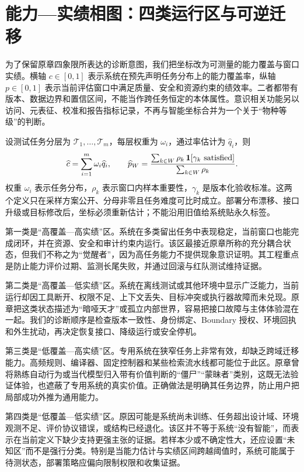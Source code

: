 \section{能力—实绩相图：四类运行区与可逆迁移}
\label{sec:section_2426}
为了保留原章四象限所表达的诊断意图，我们把坐标改为可测量的能力覆盖与窗口实绩。横轴 $c\in[0,1]$ 表示系统在预先声明任务分布上的能力覆盖率，纵轴 $p\in[0,1]$ 表示当前评估窗口中满足质量、安全和资源约束的绩效率。二者都带有版本、数据边界和置信区间，不能当作跨任务恒定的本体属性。意识相关功能另以访问、元表征、校准和报告指标记录，不再与智能坐标合并为一个关于“物种等级”的判断。

设测试任务分层为 $\mathcal T_1,\ldots,\mathcal T_m$，每层权重为 $\omega_i$，通过率估计为 $\widehat q_i$，则
\[
\widehat c=\sum_{i=1}^{m}\omega_i\widehat q_i,\qquad
\widehat p_W=\frac{\sum_{k\in W}\rho_k\,\mathbf 1[\gamma_k\ {\rm satisfied}]}
{\sum_{k\in W}\rho_k}.
\]
权重 $\omega_i$ 表示任务分布，$\rho_k$ 表示窗口内样本重要性，$\gamma_k$ 是版本化验收标准。这两个定义只在采样方案公开、分母非零且任务难度可比时成立。部署分布漂移、接口升级或目标修改后，坐标必须重新估计；不能沿用旧值给系统贴永久标签。

第一类是“高覆盖—高实绩”区。系统在多类留出任务中表现稳定，当前窗口也能完成闭环，并在资源、安全和审计约束内运行。该区最接近原章所称的充分耦合状态，但我们不称之为“觉醒者”，因为高任务能力不提供现象意识证明。其工程重点是防止能力评价过期、监测长尾失败，并通过回滚与红队测试维持证据。

第二类是“高覆盖—低实绩”区。系统在离线测试或其他环境中显示广泛能力，当前运行却因工具断开、权限不足、上下文丢失、目标冲突或执行器故障而未兑现。原章把这类状态描述为“暗哑天才”或孤立内部世界，容易把接口故障与主体体验混在一起。我们的诊断顺序是检查版本一致性、身份绑定、Boundary 授权、环境回执和外生扰动，再决定恢复接口、降级运行或安全停机。

第三类是“低覆盖—高实绩”区。专用系统在狭窄任务上非常有效，却缺乏跨域迁移能力。高频规则、编译器、固定控制器和某些检索流水线都可能位于此区。原章曾将熟练自动行为或当代模型归入带有价值判断的“僵尸”“蒙昧者”类别，这既无法验证体验，也遮蔽了专用系统的真实价值。正确做法是明确其任务边界，防止用户把局部成功外推为通用能力。

第四类是“低覆盖—低实绩”区。原因可能是系统尚未训练、任务超出设计域、环境观测不足、评价协议错误，或结构已经退化。该区并不等于系统“没有智能”，而表示在当前定义下缺少支持更强主张的证据。若样本少或不确定性大，还应设置“未知区”而不是强行分类。特别是当能力估计与实绩区间跨越阈值时，系统可能属于待测状态，部署策略应偏向限制权限和收集证据。

